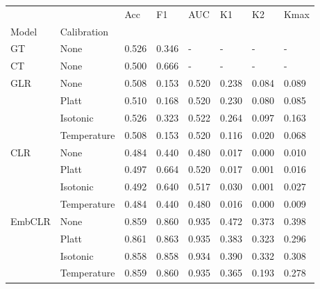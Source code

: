 \begin{tabular}{llllllll}
\toprule
 &  & Acc & F1 & AUC & K1 & K2 & Kmax \\
Model & Calibration &  &  &  &  &  &  \\
\midrule
GT & None & 0.526 & 0.346 & - & - & - & - \\
\cline{1-8}
CT & None & 0.500 & 0.666 & - & - & - & - \\
\cline{1-8}
\multirow[t]{4}{*}{GLR} & None & 0.508 & 0.153 & 0.520 & 0.238 & 0.084 & 0.089 \\
 & Platt & 0.510 & 0.168 & 0.520 & 0.230 & 0.080 & 0.085 \\
 & Isotonic & 0.526 & 0.323 & 0.522 & 0.264 & 0.097 & 0.163 \\
 & Temperature & 0.508 & 0.153 & 0.520 & 0.116 & 0.020 & 0.068 \\
\cline{1-8}
\multirow[t]{4}{*}{CLR} & None & 0.484 & 0.440 & 0.480 & 0.017 & 0.000 & 0.010 \\
 & Platt & 0.497 & 0.664 & 0.520 & 0.017 & 0.001 & 0.016 \\
 & Isotonic & 0.492 & 0.640 & 0.517 & 0.030 & 0.001 & 0.027 \\
 & Temperature & 0.484 & 0.440 & 0.480 & 0.016 & 0.000 & 0.009 \\
\cline{1-8}
\multirow[t]{4}{*}{EmbCLR} & None & 0.859 & 0.860 & 0.935 & 0.472 & 0.373 & 0.398 \\
 & Platt & 0.861 & 0.863 & 0.935 & 0.383 & 0.323 & 0.296 \\
 & Isotonic & 0.858 & 0.858 & 0.934 & 0.390 & 0.332 & 0.308 \\
 & Temperature & 0.859 & 0.860 & 0.935 & 0.365 & 0.193 & 0.278 \\
\cline{1-8}
\bottomrule
\end{tabular}
